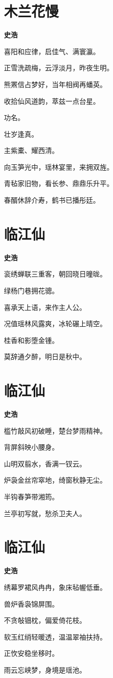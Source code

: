 \documentclass[12pt,a4paper]{ctexbook}
\begin{document}
\section{木兰花慢}
\textbf{史浩}\par\vspace{0.5em}
喜阳和应律，启佳气、满寰瀛。\par
正雪洗疏梅，云浮淡月，昨夜生明。\par
熊罴信占梦好，当年相阀再蟠英。\par
收拾仙风道韵，萃兹一点台星。\par
功名。\par
壮岁逢真。\par
主紫橐、耀西清。\par
向玉笋光中，瑶林宴里，来拥双旌。\par
青毡家旧物，看长参、鼎鼎乐升平。\par
春醑休辞介寿，鹤书已播彤廷。\par

\section{临江仙}
\textbf{史浩}\par\vspace{0.5em}
衮绣蝉联三重客，朝回晓日曈昽。\par
绿杨门巷拥花骢。\par
喜承天上语，来作主人公。\par
况值瑶林风露爽，冰轮碾上晴空。\par
桂香和影堕金锺。\par
莫辞通夕醉，明日是秋中。\par

\section{临江仙}
\textbf{史浩}\par\vspace{0.5em}
槛竹敲风初破睡，楚台梦雨精神。\par
背屏斜映小腰身。\par
山明双翦水，香满一钗云。\par
炉袅金丝帘窣地，绮窗秋静无尘。\par
半钩春笋带湘筠。\par
兰亭初写就，愁杀卫夫人。\par

\section{临江仙}
\textbf{史浩}\par\vspace{0.5em}
绣幕罗裙风冉冉，象床毡幄低垂。\par
兽炉香袅锦屏围。\par
不贪敧钿枕，偏爱倚花枝。\par
软玉红绡轻暖透，温温翠袖扶持。\par
正忺安稳坐移时。\par
雨云忘峡梦，身境是瑶池。\par
\end{document}
